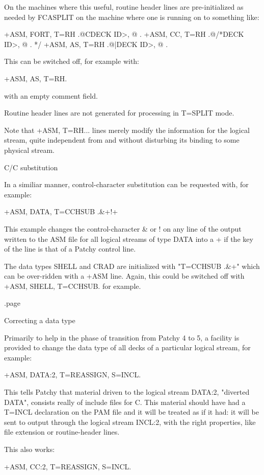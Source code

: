 On the machines where this useful, routine header lines are pre-initialized as
needed by FCASPLIT on the machine where one is running on to something like:

      +ASM, FORT, T=RH   .@CDECK  ID>, @ .
      +ASM, CC,   T=RH   .@/*DECK ID>, @ . */
      +ASM, AS,   T=RH   .@|DECK  ID>, @ .

This can be switched off, for example with:

      +ASM, AS, T=RH.

with an empty comment field.

Routine header lines are not generated for processing in T=SPLIT mode.

Note that +ASM, T=RH... lines merely modify the information for the logical
stream, quite independent from and without disturbing its binding to some
physical stream.


\item
C/C substitution

In a similiar manner, control-character substitution can be requested with,
for example:

      +ASM, DATA, T=CCHSUB   .&+!+

This example changes the control-character & or ! on any line of the output
written to the ASM file for all logical streams of type DATA into a + if
the key of the line is that of a Patchy control line.

The data types SHELL and CRAD are initialized with "T=CCHSUB .&+" which
can be over-ridden with a +ASM line. Again, this could be switched off
with +ASM, SHELL, T=CCHSUB. for example.

.page
\item
Correcting a data type

Primarily to help in the phase of transition from Patchy 4 to 5,
a facility is provided to change the data type of all decks
of a particular logical stream, for example:

      +ASM, DATA:2, T=REASSIGN, S=INCL.

This tells Patchy that material driven to the logical stream DATA:2,
"diverted DATA", consists really of include files for C. This material
should have had a T=INCL declaration on the PAM file and it will be
treated as if it had: it will be sent to output through the logical
stream INCL:2, with the right properties, like file extension or
routine-header lines.

This also works:

      +ASM, CC:2, T=REASSIGN, S=INCL.

